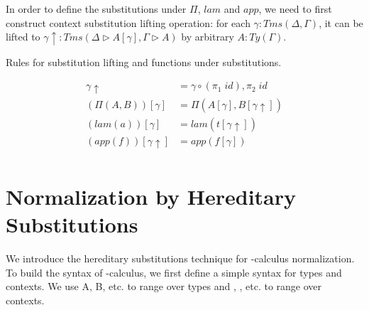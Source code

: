 {In order to define the substitutions under $\Pi$, $lam$ and $app$, we need to first construct context substitution lifting operation: for each $\gamma : Tms (\Delta, \Gamma)$, it can be lifted to $\gamma \uparrow : Tms (\Delta \triangleright A [\gamma], \Gamma \triangleright A)$ by arbitrary $A : Ty(\Gamma)$.

Rules for substitution lifting and functions under substitutions.

\begin{align*}
  \gamma \uparrow & = \gamma \circ (\pi_1\;id) , \pi_2\;id \\
  (\Pi(A,B)) [\gamma] &= \Pi (A [\gamma], B [\gamma \uparrow]) \\
  (lam (a)) [\gamma] &= lam (t [\gamma \uparrow]) \\
  (app (f)) [\gamma \uparrow] &= app (f [\gamma]) \\
\end{align*}

\section{Normalization by Hereditary Substitutions}

We introduce the hereditary substitutions technique for \lambda-calculus normalization. To build the syntax of \lambda-calculus, we first define a simple syntax for types and contexts. We use A, B, etc. to range over types and \Gamma, \Delta, etc. to range over contexts.

\begin{code}%
\>[0]\AgdaSpace{}%
\AgdaSpace{}%
\AgdaSymbol{:}\AgdaSpace{}%
\AgdaSpace{}%
\<%
\\
\>[0][@{}l@{\AgdaIndent{0}}]%
\>[2]\AgdaInductiveConstructor{*}%
\>[6]\AgdaSymbol{:}\AgdaSpace{}%
\<%
\\
%
\>[2]\AgdaSpace{}%
\AgdaSymbol{:}\AgdaSpace{}%
\AgdaSpace{}%
\AgdaSpace{}%
\AgdaSpace{}%
\AgdaSpace{}%
\<%
\\
%
\\[\AgdaEmptyExtraSkip]%
\>[0]\AgdaSpace{}%
\AgdaSpace{}%
\AgdaSymbol{:}\AgdaSpace{}%
\AgdaSpace{}%
\<%
\\
\>[0][@{}l@{\AgdaIndent{0}}]%
\>[2]%
\>[6]\AgdaSymbol{:}\AgdaSpace{}%
\<%
\\
%
\>[2]\AgdaSpace{}%
\AgdaSymbol{:}\AgdaSpace{}%
\AgdaSpace{}%
\AgdaSpace{}%
\AgdaSpace{}%
\AgdaSpace{}%
\<%
\end{code}

}
